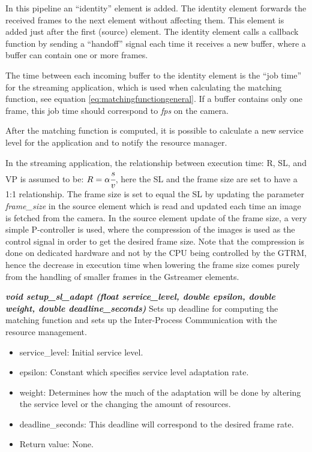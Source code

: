 \documentclass[nobiblatex]{LTHthesis}
\begin{document}
In this pipeline an ``identity'' element is added. The identity element
forwards the received frames to the next element without affecting them.
This element is added just after the first (source) element.
The identity element calls a callback function by sending a ``handoff'' 
signal each time it receives a new buffer, where a buffer can contain one or 
more frames.

The time between each incoming buffer to the identity element is the 
``job time'' for the streaming application, which is used when calculating the 
matching function, see equation \ref{eq:matchingfunctiongeneral}. 
If a buffer contains only one frame, this job time should correspond to 
\emph{fps} on the camera.

After the matching function is computed, it is possible to calculate a new
service level for the application and to notify the resource manager. 


In the streaming application, the relationship between execution time: R, SL, and VP is assumed to be:
$R=\alpha \cfrac{s}{v}$, here the SL and the frame size are set to have a 1:1 relationship.
The frame size is set to equal the SL by updating the parameter \emph{frame\_size}  in the source element which is read and updated
each time an image is fetched from the camera. In the  source element update of the frame size, a very simple P-controller is used, where 
the compression of the images is used as the control signal in order to get the desired frame size. 
Note that the compression is done on dedicated hardware and not by the CPU being controlled by the GTRM, hence the decrease in execution time when lowering
the frame size comes purely from the handling of smaller frames in the Gstreamer elements.





\begin{framed}
	\begin{flushleft}	
		\emph{\textbf{{void setup\_sl\_adapt \newline
	(float service\_level, double epsilon, double weight, double deadline\_seconds)}}} \newline
		Sets up deadline for computing the matching function and sets up the 
	Inter-Process Communication with the resource management.
		\begin{itemize}
		\item service\_level: Initial service level.
		\item epsilon: Constant which specifies service level adaptation rate.
		\item weight: Determines how the much of the adaptation will be done 
      by altering the service level or the changing the amount of resources.
		\item deadline\_seconds: This deadline will correspond to the desired frame rate.
		\item Return value: None.
	\end{itemize}
	\end{flushleft}
\end{framed}
\end{document}
